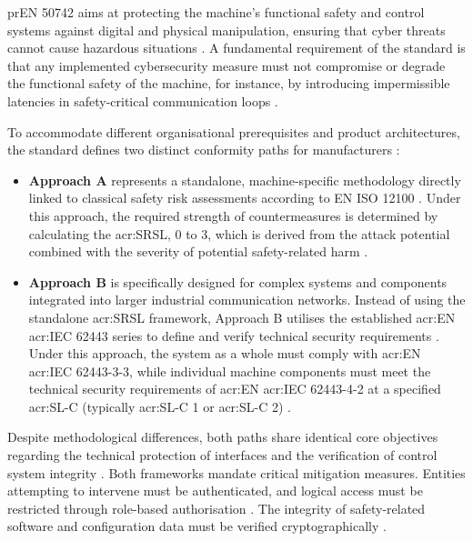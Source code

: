 prEN 50742 aims at protecting the machine's functional safety and control systems against digital and physical manipulation, ensuring that cyber threats cannot cause hazardous situations \cite[p. 10]{prEN50742_2025}. A fundamental requirement of the standard is that any implemented cybersecurity measure must not compromise or degrade the functional safety of the machine, for instance, by introducing impermissible latencies in safety-critical communication loops \cite[p. 14]{prEN50742_2025}.

To accommodate different organisational prerequisites and product architectures, the standard defines two distinct conformity paths for manufacturers \cite[p. 15]{prEN50742_2025}:
\begin{itemize}
	\item \textbf{Approach A} represents a standalone, machine-specific methodology directly linked to classical safety risk assessments according to EN ISO 12100 \cite[p. 16]{prEN50742_2025}. Under this approach, the required strength of countermeasures is determined by calculating the \gls{acr:SRSL}, 0 to 3, which is derived from the attack potential combined with the severity of potential safety-related harm \cite[p. 19]{prEN50742_2025}.
	\item \textbf{Approach B} is specifically designed for complex systems and components integrated into larger industrial communication networks. Instead of using the standalone \gls{acr:SRSL} framework, Approach B utilises the established \gls{acr:EN} \gls{acr:IEC} 62443 series to define and verify technical security requirements \cite[p. 16, 24]{prEN50742_2025}. Under this approach, the system as a whole must comply with \gls{acr:EN} \gls{acr:IEC} 62443-3-3, while individual machine components must meet the technical security requirements of \gls{acr:EN} \gls{acr:IEC} 62443-4-2 at a specified \gls{acr:SL-C} (typically \gls{acr:SL-C} 1 or \gls{acr:SL-C} 2) \cite[p. 24]{prEN50742_2025}.
\end{itemize}

Despite methodological differences, both paths share identical core objectives regarding the technical protection of interfaces and the verification of control system integrity \cite[p. 15]{prEN50742_2025}. Both frameworks mandate critical mitigation measures. Entities attempting to intervene must be authenticated, and logical access must be restricted through role-based authorisation \cite[p. 17, 24]{prEN50742_2025}. The integrity of safety-related software and configuration data must be verified cryptographically \cite[pp. 17]{prEN50742_2025}. 

